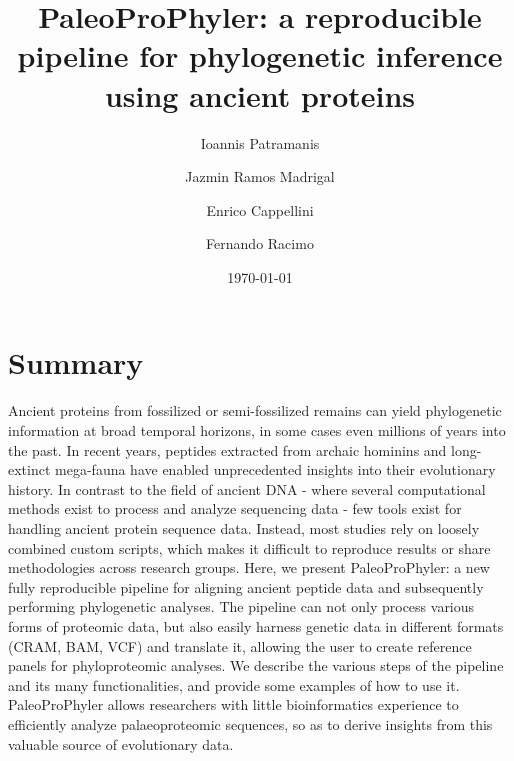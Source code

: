 \documentclass[twocolumn,showpacs,%
  nofootinbib,aps,superscriptaddress,%
  eqsecnum,prd,notitlepage,showkeys,10pt]{report}
\begin{document}
\title{\textbf{PaleoProPhyler: a reproducible pipeline for phylogenetic inference using ancient proteins}}

\author[1]{Ioannis Patramanis}
\author[3]{Jazmin Ramos Madrigal}
\author[2]{Enrico Cappellini}
\author[1,2]{Fernando Racimo}



\date{\today}

\maketitle


\section{Summary}
Ancient proteins from fossilized or semi-fossilized remains can yield phylogenetic information at broad temporal horizons, in some cases even millions of years into the past. In recent years, peptides extracted from archaic hominins and long-extinct mega-fauna have enabled unprecedented insights into their evolutionary history. In contrast to the field of ancient DNA - where several computational methods exist to process and analyze sequencing data - few tools exist for handling ancient protein sequence data. Instead, most studies rely on loosely combined custom scripts, which makes it difficult to reproduce results or share methodologies across research groups. Here, we present PaleoProPhyler: a new fully reproducible pipeline for aligning ancient peptide data and subsequently performing phylogenetic analyses. The pipeline can not only process various forms of proteomic data, but also easily harness genetic data in different formats (CRAM, BAM, VCF) and translate it, allowing the user to create reference panels for phyloproteomic analyses. We describe the various steps of the pipeline and its many functionalities, and provide some examples of how to use it. PaleoProPhyler allows researchers with little bioinformatics experience to efficiently analyze palaeoproteomic sequences, so as to derive insights from this valuable source of evolutionary data.

\paragraph{}
\end{document}
